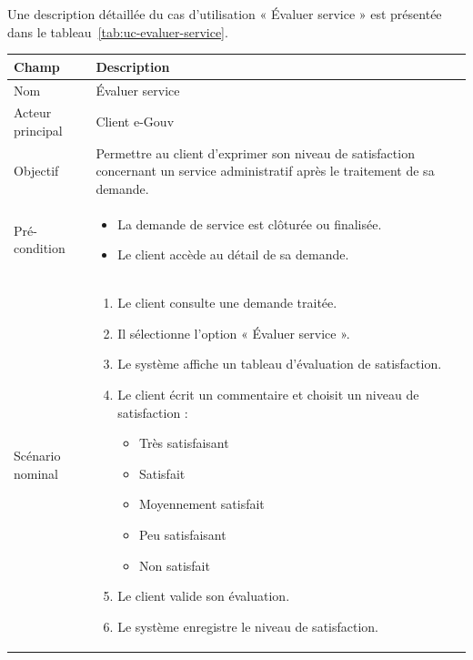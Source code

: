 Une description détaillée du cas d’utilisation « Évaluer service » est présentée dans le tableau~\ref{tab:uc-evaluer-service}.

\begin{longtable}{|p{4cm}|p{12cm}|}
\hline

\rowcolor{gray!20}
\textbf{Champ} & \textbf{Description} \\ \hline
\endfirsthead

 

Nom & Évaluer service \\ \hline

Acteur principal & Client e-Gouv \\ \hline

Objectif & Permettre au client d’exprimer son niveau de satisfaction concernant un service administratif après le traitement de sa demande. \\ \hline

Pré-condition &
\begin{itemize}
    \item La demande de service est clôturée ou finalisée.
    \item Le client accède au détail de sa demande.
\end{itemize}
\\ \hline

Scénario nominal &
\begin{enumerate}
    \item Le client consulte une demande traitée.
    \item Il sélectionne l’option « Évaluer service ».
    \item Le système affiche un tableau d’évaluation de satisfaction.
    \item Le client écrit un commentaire et choisit un niveau de satisfaction :
    \begin{itemize}
        \item Très satisfaisant
        \item Satisfait
        \item Moyennement satisfait
        \item Peu satisfaisant
        \item Non satisfait
    \end{itemize}
    \item Le client valide son évaluation.
    \item Le système enregistre le niveau de satisfaction.
\end{enumerate}
\\ \hline


\end{longtable}
